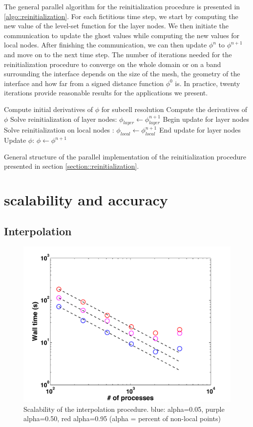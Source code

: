 \documentclass{elsarticle}
\begin{document}
The general parallel algorithm for the reinitialization procedure is presented in \ref{algo::reinitialization}. For each fictitious time step, we start by computing the new value of the level-set function for the layer nodes. We then initiate the communication to update the ghost values while computing the new values for local nodes. After finishing the communication, we can then update $\phi^n$ to $\phi^{n+1}$ and move on to the next time step. The number of iterations needed for the reinitialization procedure to converge on the whole domain or on a band surrounding the interface depends on the size of the mesh, the geometry of the interface and how far from a signed distance function $\phi^0$ is. In practice, twenty iterations provide reasonable results for the applications we present.

\begin{algorithm}[ht!]
\begin{algorithmic}
\State Compute initial derivatives of $\phi$ for subcell resolution
	\State Compute the derivatives of $\phi$
	\State Solve reinitialization of layer nodes: $\phi_{layer} \leftarrow \phi_{layer}^{n+1}$
	\State Begin update for layer nodes
	\State Solve reinitialization on local nodes : $\phi_{local} \leftarrow \phi_{local}^{n+1}$
	\State End update for layer nodes
	\State Update $\phi$: $\phi \leftarrow \phi^{n+1}$
\EndFor
\end{algorithmic}
\caption{General structure of the parallel implementation of the reinitialization procedure presented in section \ref{section::reinitialization}.} \label{algo::reinitialization}
\end{algorithm}

\section{scalability and accuracy}

\subsection{Interpolation}

\begin{figure}[ht!]
\begin{center}
\includegraphics[width=.7\textwidth]{pictures/scaling_interpolation_all.pdf}
\caption{Scalability of the interpolation procedure. blue: alpha=0.05, purple alpha=0.50, red alpha=0.95 (alpha = percent of non-local points)}
\end{center}
\end{figure}
\end{document}
